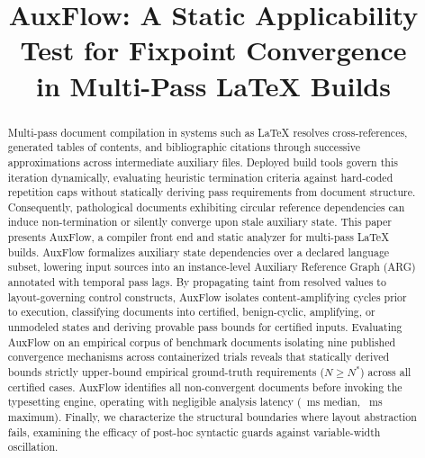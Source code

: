 \documentclass[conference]{IEEEtran}
\begin{document}
\title{AuxFlow: A Static Applicability Test for Fixpoint Convergence\\in Multi-Pass LaTeX Builds}

\author{
\and
{}
}

\maketitle

\begin{abstract}
Multi-pass document compilation in systems such as \LaTeX{} resolves cross-references, generated tables of contents, and bibliographic citations through successive approximations across intermediate auxiliary files. Deployed build tools govern this iteration dynamically, evaluating heuristic termination criteria against hard-coded repetition caps without statically deriving pass requirements from document structure. Consequently, pathological documents exhibiting circular reference dependencies can induce non-termination or silently converge upon stale auxiliary state.
This paper presents AuxFlow, a compiler front end and static analyzer for multi-pass \LaTeX{} builds. AuxFlow formalizes auxiliary state dependencies over a declared language subset, lowering input sources into an instance-level Auxiliary Reference Graph (ARG) annotated with temporal pass lags. By propagating taint from resolved values to layout-governing control constructs, AuxFlow isolates content-amplifying cycles prior to execution, classifying documents into certified, benign-cyclic, amplifying, or unmodeled states and deriving provable pass bounds for certified inputs.
Evaluating AuxFlow on an empirical corpus of \NDocs{} benchmark documents isolating nine published convergence mechanisms across \NRecords{} containerized trials reveals that statically derived bounds strictly upper-bound empirical ground-truth requirements ($N \ge N^*$) across all \NCertified{} certified cases. AuxFlow identifies all \NNonconv{} non-convergent documents before invoking the typesetting engine, operating with negligible analysis latency (\LatencyMedian{}~ms median, \LatencyMax{}~ms maximum). Finally, we characterize the structural boundaries where layout abstraction fails, examining the efficacy of post-hoc syntactic guards against variable-width oscillation.
\end{abstract}
\end{document}
